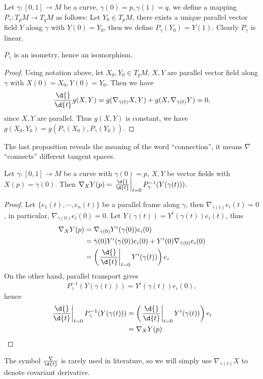 \begin{defn}
    Let $\gamma:[0,1]\to M$ be a curve, $\gamma(0)=p,\gamma(1)=q$, we define a mapping $P_\gamma:T_pM\to T_qM$ as follows:
    Let $Y_0\in T_pM$, there exists a unique parallel vector field $Y$ along $\gamma$ with $Y(0)=Y_0$, then we define $P_\gamma(Y_0)=Y(1)$.
    Clearly $P_\gamma$ is linear.
\end{defn}

\begin{prop}
    $P_\gamma$ is an isometry, hence an isomorphism.
\end{prop}
\begin{proof}
    Using notation above, let $X_0,Y_0\in T_pM$, $X,Y$ are parallel vector field along $\gamma$ with $X(0)=X_0,Y(0)=Y_0$.
    Then we have
    \[\frac{\d{}}{\d{t}}g(X,Y)=g(\nabla_{\dot{\gamma}(t)}X,Y)+g(X,\nabla_{\dot{\gamma}(t)}Y)=0,\]
    since $X,Y$ are parallel.
    Thus $g(X,Y)$ is constant, we have $g(X_0,Y_0)=g(P_\gamma(X_0),P_\gamma(Y_0))$.
\end{proof}

The last proposition reveals the meaning of the word ``connection'', it means $\nabla$ ``connects'' different tangent spaces.
\begin{prop}
    Let $\gamma:[0,1]\to M$ be a curve with $\gamma(0)=p$, $X,Y$ be vector fields with $X(p)=\dot{\gamma}(0)$.
    Then $\nabla_XY(p)=\left.\frac{\d{}}{\d{t}}\right|_{t=0}P^{-1}_\gamma(Y(\gamma(t)))$.
\end{prop}
\begin{proof}
    Let $\{e_1(t),\cdots,e_n(t)\}$ be a parallel frame along $\gamma$, then $\nabla_{\dot{\gamma}(t)}e_i(t)=0$, in particular, $\nabla_{\dot{\gamma}(0)}e_i(0)=0$.
    Let $Y(\gamma(t))=Y^i(\gamma(t))e_i(t)$, thus
    \begin{align*}
        \nabla_XY(p)&=\nabla_{\dot{\gamma}(0)}Y^i(\gamma(0))e_i(0)\\
        &=\dot{\gamma}(0)Y^i(\gamma(0))e_i(0)+Y^i(0)\nabla_{\dot{\gamma}(0)}e_i(0)\\
        &=\left(\left.\frac{\d{}}{\d{t}}\right|_{t=0}Y^i(\gamma(t))\right)e_i
    \end{align*}
    On the other hand, parallel transport gives
    \[P^{-1}_{\gamma}(Y(\gamma(t)))=Y^i(\gamma(t))e_i(0),\]
    hence
    \begin{align*}
        \left.\frac{\d{}}{\d{t}}\right|_{t=0}P^{-1}_\gamma(Y(\gamma(t)))&=\left(\left.\frac{\d{}}{\d{t}}\right|_{t=0}Y^i(\gamma(t))\right)e_i\\
        &=\nabla_XY(p)\qedhere
    \end{align*}
\end{proof}

\begin{rem}
    The symbol $\frac{\nabla}{\d{t}}$ is rarely used in literature, so we will simply use $\nabla_{\dot{\gamma}(t)}X$ to denote covariant derivative.
\end{rem}